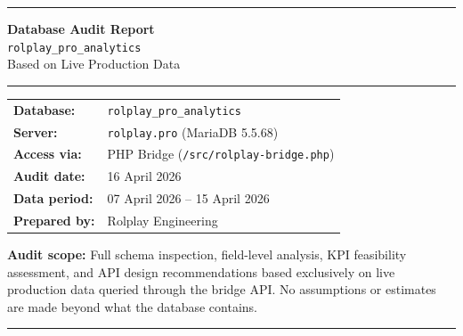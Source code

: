 \documentclass[12pt,a4paper]{article}
\begin{document}
\begin{titlepage}
  \centering
  \vspace*{2cm}

  {\color{rolred}\rule{\linewidth}{3pt}}
  \vspace{1cm}

  {\Huge\bfseries\color{rolblack} Database Audit Report}\\[0.6cm]
  {\Large\color{darkgray} \texttt{rolplay\_pro\_analytics}}\\[0.4cm]
  {\large\color{rolred} Based on Live Production Data}

  \vspace{1cm}
  {\color{rolred}\rule{\linewidth}{1.5pt}}

  \vspace{1.5cm}

  \begin{tabular}{ll}
    \textbf{Database:}    & \texttt{rolplay\_pro\_analytics} \\[4pt]
    \textbf{Server:}      & \texttt{rolplay.pro} (MariaDB 5.5.68) \\[4pt]
    \textbf{Access via:}  & PHP Bridge (\texttt{/src/rolplay-bridge.php}) \\[4pt]
    \textbf{Audit date:}  & 16 April 2026 \\[4pt]
    \textbf{Data period:} & 07 April 2026 -- 15 April 2026 \\[4pt]
    \textbf{Prepared by:} & Rolplay Engineering \\
  \end{tabular}

  \vspace{2cm}

  \begin{infobox}
    \textbf{Audit scope:} Full schema inspection, field-level analysis, KPI
    feasibility assessment, and API design recommendations based exclusively on
    live production data queried through the bridge API.  No assumptions or
    estimates are made beyond what the database contains.
  \end{infobox}

  \vfill
  {\color{rolred}\rule{\linewidth}{3pt}}
\end{titlepage}

\tableofcontents
\newpage

\end{document}
